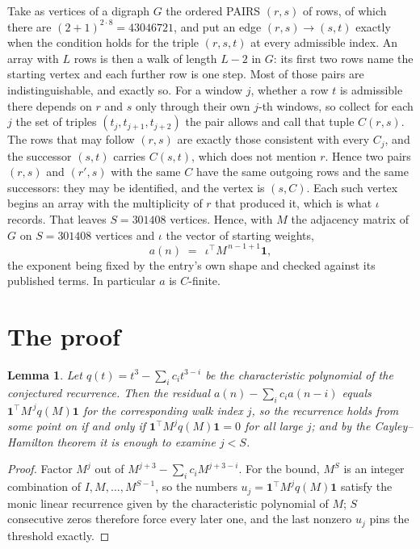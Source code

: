 \documentclass[11pt,a4paper]{article}
\theoremstyle{plain}
\newtheorem{lemma}[theorem]{Lemma}
\theoremstyle{definition}
\begin{document}
Take as vertices of a digraph $G$ the ordered PAIRS $(r,s)$ of rows, of which there are
$(2+1)^{2\cdot8}=43046721$, and put an edge $(r,s)\to(s,t)$ exactly when the condition
holds for the triple $(r,s,t)$ at every admissible index. An array with $L$ rows is then a
walk of length $L-2$ in $G$: its first two rows name the starting vertex and each further
row is one step. Most of those pairs are indistinguishable, and exactly so. For a window $j$, whether a row $t$ is admissible there depends on $r$ and $s$ only through their own $j$-th windows, so collect for each $j$ the set of triples $(t_j,t_{j+1},t_{j+2})$ the pair allows and call that tuple $C(r,s)$. The rows that may follow $(r,s)$ are exactly those consistent with every $C_j$, and the successor $(s,t)$ carries $C(s,t)$, which does not mention $r$. Hence two pairs $(r,s)$ and $(r',s)$ with the same $C$ have the same outgoing rows and the same successors: they may be identified, and the vertex is $(s,C)$. Each such vertex begins an array with the multiplicity of $r$ that produced it, which is what $\iota$ records. That leaves $S=301408$ vertices. Hence, with $M$ the adjacency matrix of $G$ on $S=301408$ vertices and
$\iota$ the vector of starting weights,
\[
a(n)\;=\;\,\iota^{\!\top}M^{\,n-1+1}\mathbf{1},
\]
the exponent being fixed by the entry's own shape and checked against its published terms.
In particular $a$ is $C$-finite.

\section{The proof}

\begin{lemma}\label{lem:crit}
Let $q(t)=t^{3}-\sum_i c_it^{3-i}$ be the characteristic polynomial of the
conjectured recurrence. Then the residual $a(n)-\sum_ic_ia(n-i)$ equals
$\mathbf{1}^{\!\top}M^{\,j}q(M)\mathbf{1}$ for the corresponding walk index
$j$, so the recurrence holds from some point on if and only if
$\mathbf{1}^{\!\top}M^{j}q(M)\mathbf{1}=0$ for all large $j$; and by the
Cayley--Hamilton theorem it is enough to examine $j<S$.
\end{lemma}

\begin{proof}
Factor $M^{j}$ out of $M^{j+3}-\sum_ic_iM^{j+3-i}$. For the bound, $M^{S}$
is an integer combination of $I,M,\dots,M^{S-1}$, so the numbers
$u_j=\mathbf{1}^{\!\top}M^{j}q(M)\mathbf{1}$ satisfy the monic linear recurrence given by
the characteristic polynomial of $M$; $S$ consecutive zeros therefore force every later one,
and the last nonzero $u_j$ pins the threshold exactly.
\end{proof}
\end{document}
